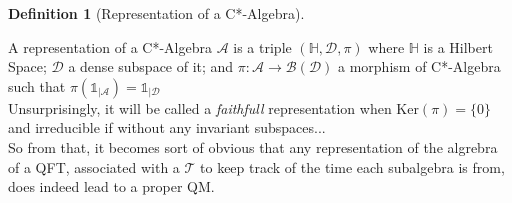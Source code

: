 \documentclass[a4paper,11pt]{article}
\numberwithin{equation}{section}
\theoremstyle{definition}
\newtheorem{definition}{Definition}
\newtheorem{comment}{Comment}
\begin{document}

\begin{definition}[Representation of a C*-Algebra]$\quad$

    A representation of a C*-Algebra $\mathcal{A}$ is a triple $(\mathbb{H},\mathcal{D},\pi)$ where $\mathbb{H}$ is a Hilbert Space; $\mathcal{D}$ a dense subspace of it; and $\pi : \mathcal{A}\to\mathcal{B}(\mathcal{D})$ a morphism of C*-Algebra such that $\pi(\mathds{1}_{|\mathcal{A}})=\mathds{1}_{|\mathcal{D}}$\\
    Unsurprisingly, it will be called a \emph{faithfull} representation when $\mathrm{Ker}(\pi)=\{0\}$ and irreducible if without any invariant subspaces...
    \\ So from that, it becomes sort of obvious that any representation of the algrebra of a QFT, associated with a $\mathcal{T}$ to keep track of the time each subalgebra is from, does indeed lead to a proper QM.
\end{definition}

\end{document}

